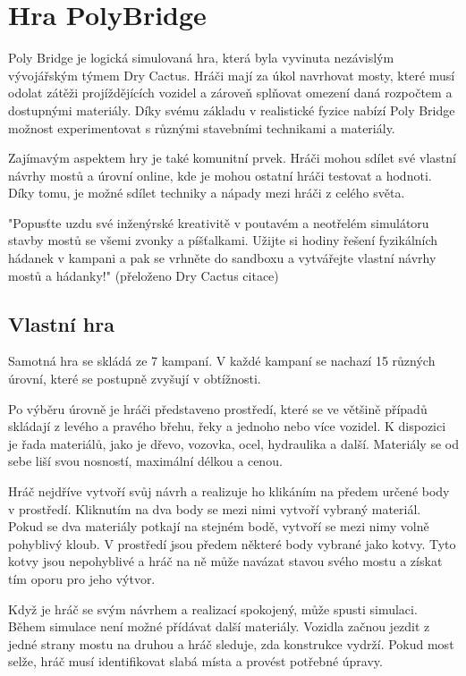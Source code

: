 \chapter{Hra PolyBridge}

Poly Bridge je logická simulovaná hra, která byla vyvinuta nezávislým vývojářským týmem Dry Cactus. Hráči mají za úkol navrhovat mosty, které musí odolat zátěži projíždějících vozidel a zároveň splňovat omezení daná rozpočtem a dostupnými materiály. Díky svému základu v realistické fyzice nabízí Poly Bridge možnost experimentovat s různými stavebními technikami a materiály.

Zajímavým aspektem hry je také komunitní prvek. Hráči mohou sdílet své vlastní návrhy mostů a úrovní online, kde je mohou ostatní hráči testovat a hodnoti. Díky tomu, je možné sdílet techniky a nápady mezi hráči z celého světa. 

"Popusťte uzdu své inženýrské kreativitě v poutavém a neotřelém simulátoru stavby mostů se všemi zvonky a píšťalkami. Užijte si hodiny řešení fyzikálních hádanek v kampani a pak se vrhněte do sandboxu a vytvářejte vlastní návrhy mostů a hádanky!" (přeloženo Dry Cactus citace)

\section{Vlastní hra}

Samotná hra se skládá ze 7 kampaní. V každé kampaní se nachazí 15 různých úrovní, které se postupně zvyšují v obtížnosti.

Po výběru úrovně je hráči představeno prostředí, které se ve většině případů skládají z levého a pravého břehu, řeky a jednoho nebo více vozidel. K dispozici je řada materiálů, jako je dřevo, vozovka, ocel, hydraulika a další. Materiály se od sebe liší svou nosností, maximální délkou a cenou.

Hráč nejdříve vytvoří svůj návrh a realizuje ho klikáním na předem určené body v prostředí. Kliknutím na dva body se mezi nimi vytvoří vybraný materiál. Pokud se dva materiály potkají na stejném bodě, vytvoří se mezi nimy volně pohyblivý kloub. V prostředí jsou předem některé body vybrané jako kotvy. Tyto kotvy jsou nepohyblivé a hráč na ně může navázat stavou svého mostu a získat tím oporu pro jeho výtvor.

Když je hráč se svým návrhem a realizací spokojený, může spusti simulaci. Během simulace není možné přídávat další materiály. Vozidla začnou jezdit z jedné strany mostu na druhou a hráč sleduje, zda konstrukce vydrží. Pokud most selže, hráč musí identifikovat slabá místa a provést potřebné úpravy.

